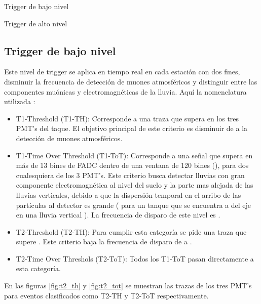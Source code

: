 		\begin{shortitemize}
		\item Trigger de bajo nivel
		\item Trigger de alto nivel
		\end{shortitemize}
		
			\subsection*{Trigger de bajo nivel}
			
			Este nivel de trigger se aplica en tiempo real en cada estaci\'on con dos fines, disminuir la frecuencia de detecci\'on de muones atmosf\'ericos y distinguir entre las componentes mu\'onicas y electromagn\'eticas de la lluvia.
			Aqu\'i la nomenclatura utilizada \cite{nimtrig}:
			
			\begin{itemize}
			\item T1-Threshold (T1-TH): Corresponde a una traza que supera  en los tres PMT's del taque. El objetivo principal de este criterio es disminuir de  a  la detecci\'on de muones atmosf\'ericos.
			\item T1-Time Over Threshold (T1-ToT): Corresponde a una se\~nal que supera  en m\'as de 13 bines de FADC dentro de una ventana de 120 bines (), para dos cualesquiera de los 3 PMT's. Este criterio busca detectar lluvias con gran componente electromagn\'etica al nivel del suelo y la parte mas alejada de las lluvias verticales, debido a que la dispersi\'on temporal en el arribo de las part\'iculas al detector es grande ( para un tanque que se encuentra a  del eje en una lluvia vertical \cite{disp1,disp2}). La frecuencia de disparo de este nivel es .
			\item T2-Threshold (T2-TH): Para cumplir esta categor\'ia se pide una traza que supere . Este criterio baja la frecuencia de disparo de  a .
			\item T2-Time Over Threshols (T2-ToT): Todos los T1-ToT pasan directamente a esta categor\'ia. %
			\end{itemize}
			
			En las figuras \ref{fig:t2_th} y \ref{fig:t2_tot} se muestran las trazas de los tres PMT's para eventos clasificados como T2-TH y T2-ToT respectivamente.
			

